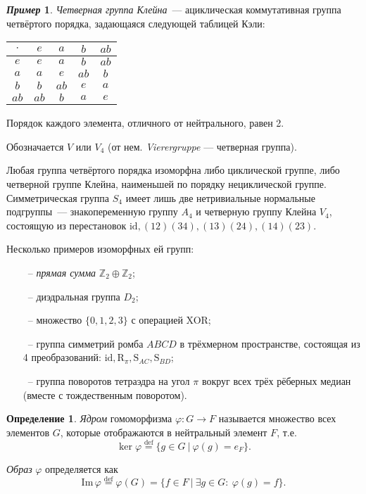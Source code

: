 \documentclass[a4paper, 14pt]{extarticle}
\newcommand{\deq}{\stackrel{\mathrm{def}}{=}}
\newcommand{\n}{\par}
\newcommand{\integers}{\mathbb{Z}}
\newcommand{\suchthat}{{:}{ } \ }
\newcommand{\im}{\mathrm{Im} \,}
\newcommand{\id}{\mathrm{id}}
\newcommand{\Rot}{\mathrm{R}}
\newcommand{\Sym}{\mathrm{S}}
\renewcommand{\phi}{\varphi}
\theoremstyle{definition}
\newtheorem*{exmpl*}{\textit{Пример}}
\newtheorem{definition}{Определение}
\theoremstyle{plain}
\numberwithin{theorem}{section}
\numberwithin{definition}{section}
\numberwithin{statement}{section}
\numberwithin{lemma}{section}
\numberwithin{consequence}{section}
\begin{document}
	\newpage
	\begin{exmpl*}
		\textit{Четверная группа Клейна}~--- ациклическая коммутативная группа четвёртого порядка, задающаяся следующей таблицей Кэли: \n
		
		\begin{center}
			\begin{tabular}{c |c c c c}
				$\cdot$ & $e$ & $a$ & $b$ & $ab$\\
				\hline
				$e$ & $e$ & $a$ & $b$ & $ab$\\
				
				$a$ & $a$ & $e$ & $ab$ & $b$\\
				
				$b$ & $b$ & $ab$ & $e$ & $a$\\
				
				$ab$ & $ab$ & $b$ & $a$ & $e$\\
			\end{tabular}
		\end{center} \n
		Порядок каждого элемента, отличного от нейтрального, равен 2. \n
		Обозначается $V$ или $V_4$ (от нем. \textit{Vierergruppe} — четверная группа). \n
		Любая группа четвёртого порядка изоморфна либо циклической группе, либо четверной группе Клейна, наименьшей по порядку нециклической группе. Симметрическая группа $S_4$ имеет лишь две нетривиальные нормальные подгруппы~--- знакопеременную группу $A_4$ и четверную группу Клейна $V_4$, состоящую из перестановок ${\mathrm{id}, (12)(34), (13)(24), (14)(23).}$ \n
		Несколько примеров изоморфных ей групп:
		\begin{itemize}
			\setlength\itemsep{0.1em}
			\item[~--] \textit{прямая сумма} $\integers_2 \oplus \integers_2$;
			\item[~--] диэдральная группа $D_2;$
			\item[~--] множество ${\{0, 1, 2, 3\}}$ с операцией XOR;
			\item[~--] группа симметрий ромба $ABCD$ в трёхмерном пространстве, состоящая из 4 преобразований: ${\id, \Rot_\pi, \Sym_{AC}, \Sym_{BD}}$;
			\item[~--] группа поворотов тетраэдра на угол $\pi$ вокруг всех трёх рёберных медиан (вместе с тождественным поворотом).
		\end{itemize}
	\end{exmpl*}
	\newpage
	\begin{definition}
		\textit{Ядром} гомоморфизма ${\phi: G \rightarrow F}$ называется множество всех элементов $G$, которые отображаются в нейтральный элемент $F$, т.е.
		\begin{equation*}
			\ker \phi \deq \{g \in G \ | \ \phi(g) = e_F\}.
		\end{equation*} \n
		\textit{Образ} $\phi$ определяется как
		\begin{equation*}
			\im \phi \deq \phi(G) = \{f \in F \ | \ \exists g \in G \suchthat \phi(g) = f\}.
		\end{equation*}
	\end{definition}
\end{document}
